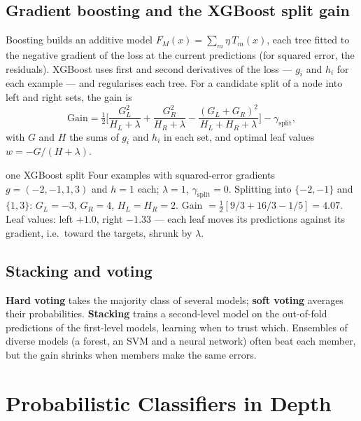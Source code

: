 \documentclass[11pt]{article}
\begin{document}
\subsection{Gradient boosting and the XGBoost split gain}
Boosting builds an additive model $F_M(x)=\sum_m\eta\,T_m(x)$, each tree fitted to the negative gradient of the loss at the current predictions (for squared error, the residuals). XGBoost uses first and second derivatives of the loss --- $g_i$ and $h_i$ for each example --- and regularises each tree. For a candidate split of a node into left and right sets, the gain is
\[\text{Gain}=\tfrac12\Big[\frac{G_L^2}{H_L+\lambda}+\frac{G_R^2}{H_R+\lambda}-\frac{(G_L+G_R)^2}{H_L+H_R+\lambda}\Big]-\gamma_{\text{split}},\]
with $G$ and $H$ the sums of $g_i$ and $h_i$ in each set, and optimal leaf values $w=-G/(H+\lambda)$.
\begin{example}{one XGBoost split}
Four examples with squared-error gradients $g=(-2,-1,1,3)$ and $h=1$ each; $\lambda=1$, $\gamma_{\text{split}}=0$. Splitting into $\{-2,-1\}$ and $\{1,3\}$: $G_L=-3$, $G_R=4$, $H_L=H_R=2$. Gain $=\frac12[9/3+16/3-1/5]=4.07$. Leaf values: left $+1.0$, right $-1.33$ --- each leaf moves its predictions against its gradient, i.e.\ toward the targets, shrunk by $\lambda$.
\end{example}

\subsection{Stacking and voting}
\textbf{Hard voting} takes the majority class of several models; \textbf{soft voting} averages their probabilities. \textbf{Stacking} trains a second-level model on the out-of-fold predictions of the first-level models, learning when to trust which. Ensembles of diverse models (a forest, an SVM and a neural network) often beat each member, but the gain shrinks when members make the same errors.

\section{Probabilistic Classifiers in Depth}
\end{document}
